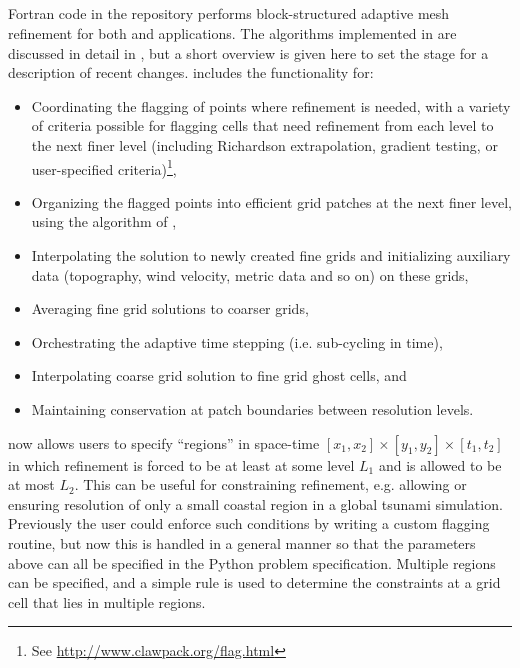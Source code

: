 %
%
%

\subsection{\amrclaw} \label{sec:amrclaw}
Fortran code in the \amrclaw repository performs block-structured adaptive mesh
refinement \cite{BO,BC} for both \clawpack and \geoclaw  applications.
The algorithms implemented in \amrclaw are discussed in detail in
\cite{mjb-rjl:amrclaw,LeVequeGeorgeBerger:an11}, but a  short overview is given
here to set the stage for a description of recent changes.
\amrclaw includes the functionality for:
\begin{itemize}
\item Coordinating the flagging of points where refinement is needed,
with a variety of criteria possible for flagging cells that need refinement
from each level to the next finer level (including Richardson extrapolation,
gradient testing, or user-specified criteria)\footnote{See
\url{http://www.clawpack.org/flag.html}},
\item Organizing the flagged points into efficient grid
patches at the next finer level, using the algorithm of
\cite{mjb-rig:cluster},
\item Interpolating the solution to newly created fine grids and initializing
auxiliary data (topography, wind velocity, metric data and so on) on  these
grids,
\item Averaging fine grid solutions to coarser grids,
\item Orchestrating the adaptive time stepping (i.e. sub-cycling in time),
\item Interpolating coarse grid solution to fine grid ghost cells, and
\item Maintaining conservation at patch boundaries between resolution levels.
\end{itemize}

\amrclaw now allows users to specify ``regions'' in space-time
$[x_1,x_2] \times [y_1,y_2] \times [t_1,t_2]$ in which refinement is forced to
be at least at some level $L_1$ and is allowed to be at most $L_2$.  This can be
useful for constraining refinement, e.g. allowing or ensuring resolution of only
a small coastal region in a global tsunami simulation. Previously the user could
enforce such conditions by writing a custom flagging routine, but now this is
handled in a general manner so that the parameters above can all be specified in
the Python problem specification. Multiple regions can be specified, and a
simple rule is used to determine the constraints at a grid cell that lies in
multiple regions.

